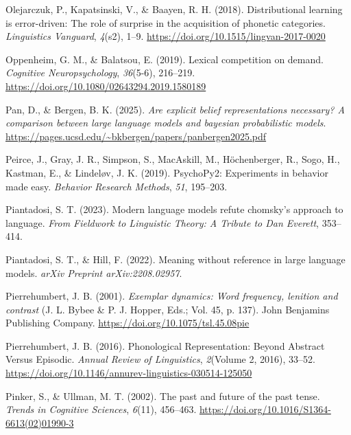 \documentclass[
  12pt,
  letterpaper,
]{scrreprt}
\newlength{\cslhangindent}
\newenvironment{CSLReferences}[2] %
 {\begin{list}{}{%
  \setlength{\itemindent}{0pt}
  \setlength{\leftmargin}{0pt}
  \setlength{\parsep}{0pt}
  \ifodd #1
   \setlength{\leftmargin}{\cslhangindent}
   \setlength{\itemindent}{-1\cslhangindent}
  \fi
  \setlength{\itemsep}{#2\baselineskip}}}
 {\end{list}}
\begin{document}
\begin{CSLReferences}{1}{0}
Olejarczuk, P., Kapatsinski, V., \& Baayen, R. H. (2018). Distributional
learning is error-driven: The role of surprise in the acquisition of
phonetic categories. \emph{Linguistics Vanguard}, \emph{4}(s2), 1--9.
\url{https://doi.org/10.1515/lingvan-2017-0020}

Oppenheim, G. M., \& Balatsou, E. (2019). Lexical competition on demand.
\emph{Cognitive Neuropsychology}, \emph{36}(5-6), 216--219.
\url{https://doi.org/10.1080/02643294.2019.1580189}

Pan, D., \& Bergen, B. K. (2025). \emph{Are explicit belief
representations necessary? A comparison between large language models
and bayesian probabilistic models}.
\url{https://pages.ucsd.edu/~bkbergen/papers/panbergen2025.pdf}

Peirce, J., Gray, J. R., Simpson, S., MacAskill, M., Höchenberger, R.,
Sogo, H., Kastman, E., \& Lindeløv, J. K. (2019). PsychoPy2: Experiments
in behavior made easy. \emph{Behavior Research Methods}, \emph{51},
195--203.

Piantadosi, S. T. (2023). Modern language models refute chomsky's
approach to language. \emph{From Fieldwork to Linguistic Theory: A
Tribute to Dan Everett}, 353--414.

Piantadosi, S. T., \& Hill, F. (2022). Meaning without reference in
large language models. \emph{arXiv Preprint arXiv:2208.02957}.

Pierrehumbert, J. B. (2001). \emph{Exemplar dynamics: Word frequency,
lenition and contrast} (J. L. Bybee \& P. J. Hopper, Eds.; Vol. 45, p.
137). John Benjamins Publishing Company.
\url{https://doi.org/10.1075/tsl.45.08pie}

Pierrehumbert, J. B. (2016). Phonological Representation: Beyond
Abstract Versus Episodic. \emph{Annual Review of Linguistics},
\emph{2}(Volume 2, 2016), 33--52.
\url{https://doi.org/10.1146/annurev-linguistics-030514-125050}

Pinker, S., \& Ullman, M. T. (2002). The past and future of the past
tense. \emph{Trends in Cognitive Sciences}, \emph{6}(11), 456--463.
\url{https://doi.org/10.1016/S1364-6613(02)01990-3}


\end{CSLReferences}
\end{document}

